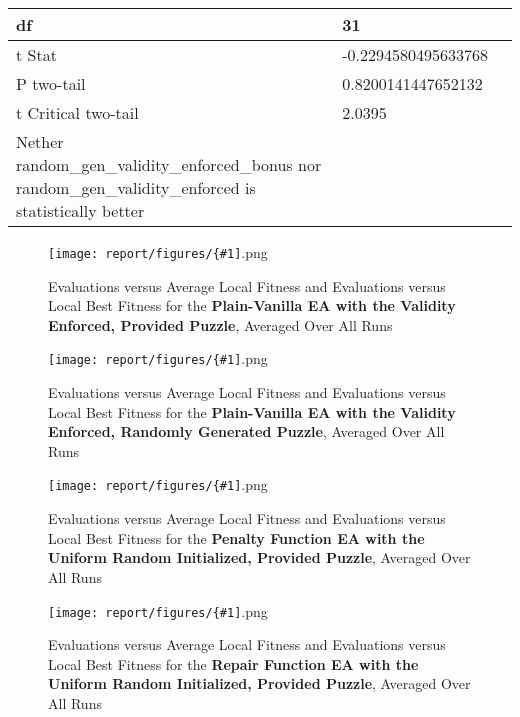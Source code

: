 \documentclass[11pt]{article}
\newcommand{\fitnessplotcaption}[1]{\caption{Evaluations versus Average Local Fitness and Evaluations versus 
    Local Best Fitness for the \textbf{{#1}}, Averaged Over All Runs}}
\newcommand{\addgraphic}[1]{\centerline{\texttt{[image: report/figures/\{\#1]}.png}}}
\begin{document}
\begin{table}[]
{\begin{tabular}{|l|l|l|}
df                                                                                                        & 31                              &                                        \\ \hline
t Stat                                                                                                    & -0.2294580495633768             &                                        \\ \hline
P two-tail                                                                                                & 0.8200141447652132              &                                        \\ \hline
t Critical two-tail                                                                                       & 2.0395                          &                                        \\ \hline
Nether random\_gen\_validity\_enforced\_bonus nor random\_gen\_validity\_enforced is statistically better &                                 &                                        \\ \hline
\end{tabular}%
}
\end{table}


\begin{figure}
    \addgraphic{website_puzzle_validity_enforced_vanilla_graph}
    \fitnessplotcaption{Plain-Vanilla EA with the Validity Enforced, Provided Puzzle}
    \label{fig:website_puzzle_validity_enforced_vanilla_graph}
\end{figure}

\begin{figure}
    \addgraphic{random_gen_validity_enforced_vanilla_graph}
    \fitnessplotcaption{Plain-Vanilla EA with the Validity Enforced, Randomly Generated Puzzle}
    \label{fig:random_gen_validity_enforced_vanilla_graph}
\end{figure}

\begin{figure}
    \addgraphic{website_puzzle_uniform_random_graph}
    \fitnessplotcaption{Penalty Function EA with the Uniform Random Initialized, Provided Puzzle}
    \label{fig:website_puzzle_uniform_random_graph}
\end{figure}

\begin{figure}
    \addgraphic{website_puzzle_uniform_random_bonus_graph}
    \fitnessplotcaption{Repair Function EA with the Uniform Random Initialized, Provided Puzzle}
    \label{fig:website_puzzle_uniform_random_bonus_graph}
\end{figure}
\end{document}

